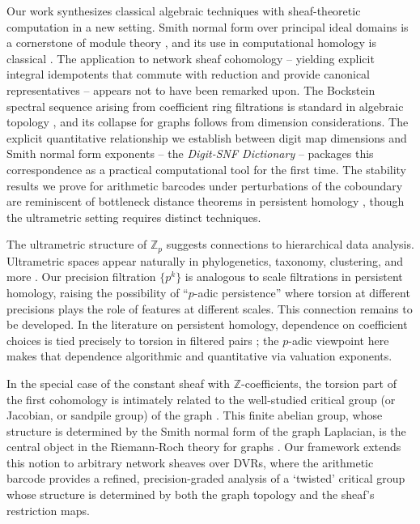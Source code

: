 \documentclass[11pt]{amsart}
\theoremstyle{plain}
\theoremstyle{definition}
\newcommand{\Zp}{\mathbb{Z}_p}                        %
\begin{document}
Our work synthesizes classical algebraic techniques with sheaf-theoretic computation in a new setting. Smith normal form over principal ideal domains is a cornerstone of module theory \cite{Newman_IntegralMatrices_1972,Kannan1979,Rotman2009}, and its use in computational homology is classical \cite{ZomorodianCarlsson2005,EdelsbrunnerHarer_CT_2010,MischaikowMrozek2002_ComputationalHomology}.
The application to network sheaf cohomology -- yielding explicit integral idempotents that commute with reduction and provide canonical representatives -- appears not to have been remarked upon. The Bockstein spectral sequence arising from coefficient ring filtrations is standard in algebraic topology \cite{McCleary2000,Rotman2009}, and its collapse for graphs follows from dimension considerations. The explicit quantitative relationship we establish between digit map dimensions and Smith normal form exponents -- the {\em Digit-SNF Dictionary} -- packages this correspondence as a practical computational tool for the first time. The stability results we prove for arithmetic barcodes under perturbations of the coboundary are reminiscent of bottleneck distance theorems in persistent homology \cite{CohenSteiner2006,EdelsbrunnerHarer_CT_2010}, though the ultrametric setting requires distinct techniques.

The ultrametric structure of $\Zp$ suggests connections to hierarchical data analysis. Ultrametric spaces appear naturally in phylogenetics, taxonomy, clustering, and more \cite{KuchakiRafsanjani2012}. Our precision filtration $\{p^k\}$ is analogous to scale filtrations in persistent homology, raising the possibility of ``$p$-adic persistence'' where torsion at different precisions plays the role of features at different scales. This connection remains to be developed. In the literature on persistent homology, dependence on coefficient choices is tied precisely to torsion in filtered pairs \cite{ObayashiYoshiwaki2023}; the $p$-adic viewpoint here makes that dependence algorithmic and quantitative via valuation exponents.

In the special case of the constant sheaf with $\mathbb{Z}$-coefficients, the torsion part of the first cohomology is intimately related to the well-studied critical group (or Jacobian, or sandpile group) of the graph \cite{Biggs1999_CriticalGroup, Lorenzini1991_GroupLaplacian}. This finite abelian group, whose structure is determined by the Smith normal form of the graph Laplacian, is the central object in the Riemann-Roch theory for graphs \cite{BakerNorine2007_RiemannRochGraphs}. Our framework extends this notion to arbitrary network sheaves over DVRs, where the arithmetic barcode provides a refined, precision-graded analysis of a `twisted' critical group whose structure is determined by both the graph topology and the sheaf's restriction maps.
\end{document}
